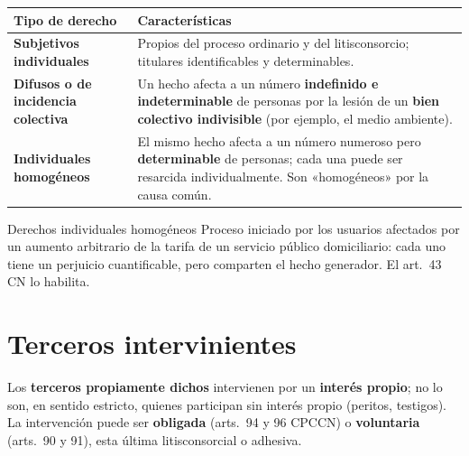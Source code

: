 \documentclass[12pt,oneside]{book}
\renewcommand{\arraystretch}{1.15}
\begin{document}
\begin{table}[H]
\centering
\renewcommand{\arraystretch}{1.25}
\begin{tabularx}{\textwidth}{>{\bfseries\RaggedRight\arraybackslash}p{}>{\RaggedRight\arraybackslash}X}
\toprule
Tipo de derecho & Características \\
\midrule
Subjetivos individuales & Propios del proceso ordinario y del litisconsorcio; titulares identificables y determinables. \\
\addlinespace
Difusos o de incidencia colectiva & Un hecho afecta a un número \textbf{indefinido e indeterminable} de personas por la lesión de un \textbf{bien colectivo indivisible} (por ejemplo, el medio ambiente). \\
\addlinespace
Individuales homogéneos & El mismo hecho afecta a un número numeroso pero \textbf{determinable} de personas; cada una puede ser resarcida individualmente. Son «homogéneos» por la causa común. \\
\bottomrule
\end{tabularx}
\end{table}

\begin{ejemplo}{Derechos individuales homogéneos}
Proceso iniciado por los usuarios afectados por un aumento arbitrario de la tarifa de un servicio público domiciliario: cada uno tiene un perjuicio cuantificable, pero comparten el hecho generador. El art.~43 CN lo habilita.
\end{ejemplo}

\section{Terceros intervinientes}

Los \textbf{terceros propiamente dichos} intervienen por un \textbf{interés propio}; no lo son, en sentido estricto, quienes participan sin interés propio (peritos, testigos). La intervención puede ser \textbf{obligada} (arts.~94 y 96 CPCCN) o \textbf{voluntaria} (arts.~90 y 91), esta última litisconsorcial o adhesiva.
\end{document}

